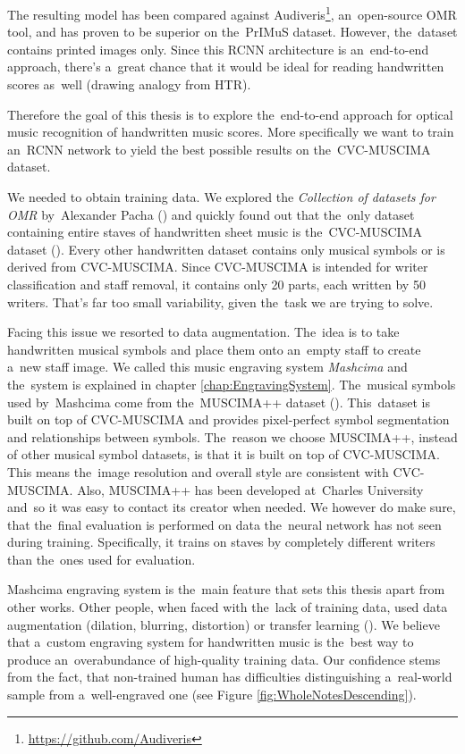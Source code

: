 The resulting model has been compared against Audiveris\footnote{\href{https://github.com/Audiveris}{https://github.com/Audiveris}}, an~open-source OMR tool, and has proven to be superior on the~PrIMuS dataset. However, the~dataset contains printed images only. Since this RCNN architecture is an~end-to-end approach, there's a~great chance that it would be ideal for reading handwritten scores as~well (drawing analogy from HTR).

Therefore the goal of this thesis is to explore the~end-to-end approach for optical music recognition of handwritten music scores. More specifically we want to train an~RCNN network to yield the best possible results on the~CVC-MUSCIMA dataset.

\overfullrule=0pt %
We needed to obtain training data. We explored the \emph{Collection of datasets for OMR} by~Alexander Pacha (\cite{Pacha}) and quickly found out that the~only dataset containing entire staves of handwritten sheet music is the~CVC-MUSCIMA dataset (\cite{CvcMuscima}). Every other handwritten dataset contains only musical symbols or is derived from CVC-MUSCIMA. Since CVC-MUSCIMA is intended for writer classification and staff removal, it contains only 20 parts, each written by 50 writers. That's far too small variability, given the~task we are trying to solve.

Facing this issue we resorted to data augmentation. The~idea is to take handwritten musical symbols and place them onto an~empty staff to create a~new staff image. We called this music engraving system \emph{Mashcima} and the~system is explained in chapter \ref{chap:EngravingSystem}. The~musical symbols used by~Mashcima come from the~MUSCIMA++ dataset (\cite{MuscimaPP}). This~dataset is built on top of CVC-MUSCIMA and provides pixel-perfect symbol segmentation and relationships between symbols. The~reason we choose MUSCIMA++, instead of other musical symbol datasets, is that it is built on top of CVC-MUSCIMA. This means the~image resolution and overall style are consistent with CVC-MUSCIMA. Also, MUSCIMA++ has been developed at~Charles University and~so it was easy to contact its creator when needed. We however do make sure, that the~final evaluation is performed on data the~neural network has not seen during training. Specifically, it trains on staves by completely different writers than the~ones used for evaluation.

Mashcima engraving system is the~main feature that sets this thesis apart from other works. Other people, when faced with the~lack of training data, used data augmentation (dilation, blurring, distortion) or transfer learning (\cite{HmrBaseline}). We believe that a~custom engraving system for handwritten music is the~best way to produce an~overabundance of high-quality training data. Our confidence stems from the fact, that non-trained human has difficulties distinguishing a~real-world sample from a~well-engraved one (see Figure \ref{fig:WholeNotesDescending}).

